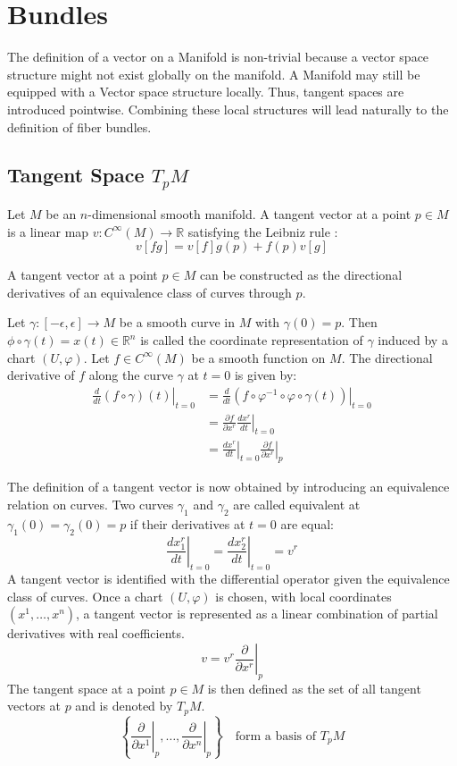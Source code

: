
\chapter{Bundles}

  The definition of a vector on a Manifold is non-trivial because a vector space structure might not exist globally on the manifold. A Manifold may still be equipped with a Vector space structure locally. Thus, tangent spaces are introduced pointwise. Combining these local structures will lead naturally to the definition of fiber bundles.

\section{Tangent Space $T_pM$}

  Let $M$ be an $n$-dimensional smooth manifold. A tangent vector at a point $p \in M$ is a linear map $v: C^\infty(M) \to \mathbb{R}$ satisfying the Leibniz rule \cite{FredericSchullerDifferentialstructurespivotalconcepttangentvectorspacesLec09FredericSchuller2015}:
 \[ v[fg] = v[f]g(p) + f(p)v[g] \]

  A tangent vector at a point $p \in M$ can be constructed as the directional derivatives of an equivalence class of curves through $p$\cite{NakaharaGeometrytopologyphysics2005}.

  Let $\gamma: [-\epsilon, \epsilon] \to M$ be a smooth curve in $M$ with $\gamma(0)=p$. Then $\phi \circ \gamma(t) = x(t) \in \mathbb{R}^n$ is called the coordinate representation of $\gamma$ induced by a chart $(U, \varphi)$.
Let $f \in C^\infty(M)$ be a smooth function on $M$. The directional derivative of $f$ along the curve $\gamma$ at $t=0$ is given by:
\begin{align*}
\left. \frac{d}{dt} (f \circ \gamma)(t) \right|_{t=0}
  &= \left. \frac{d}{dt} \left( f\circ \varphi^{-1}\circ\varphi\circ\gamma(t) \right) \right|_{t=0} \\[0.8em]
&= \left. \frac{\partial f}{\partial x^r} \frac{d x^r}{dt} \right|_{t=0} \\[0.8em]
&= \left. \frac{d x^r}{dt} \right|_{t=0} \left. \frac{\partial f}{\partial x^r} \right|_p
\end{align*}

The definition of a tangent vector is now obtained by introducing an equivalence relation on curves. Two curves $\gamma_1$ and $\gamma_2$ are called equivalent at $\gamma_1(0)=\gamma_2(0)=p$ if their derivatives at $t=0$ are equal:
\[
\left. \frac{d x_1^r}{dt} \right|_{t=0}
= \left. \frac{d x_2^r}{dt} \right|_{t=0}
= v^r
\]
A tangent vector is identified with the differential operator given the equivalence class of curves. Once a chart $(U, \varphi)$ is chosen, with local coordinates $(x^1, \dots, x^n)$, a tangent vector is represented as a linear combination of partial derivatives with real coefficients.
\[
v = v^r \left. \frac{\partial}{\partial x^r} \right|_p
\]
The tangent space at a point $p \in M$ is then defined as the set of all tangent vectors at $p$ and is denoted by $T_pM$.
\[
\left\{ \left. \frac{\partial}{\partial x^1} \right|_p, \dots, \left. \frac{\partial}{\partial x^n} \right|_p \right\} \quad \text{form a basis of } T_pM
\]



